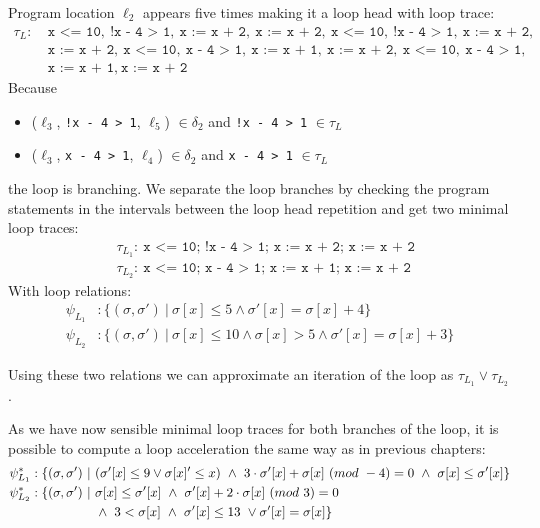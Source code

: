 \documentclass{article}
\begin{document}
Program location $\ell_2$ appears five times making it a loop head with loop trace:
\begin{align*}
    \tau_L:\ &\texttt{x <= 10},\ \texttt{!x - 4 > 1},\ \texttt{x := x + 2},\ \texttt{x := x + 2},\ \texttt{x <= 10},\ \texttt{!x - 4 > 1},\ \texttt{x := x + 2},\ \\ &\texttt{x := x + 2},\ \texttt{x <= 10},\ \texttt{x - 4 > 1},\ \texttt{x := x + 1},\ \texttt{x := x + 2},\ \texttt{x <= 10},\ \texttt{x - 4 > 1},\ \\ &\texttt{x := x + 1},\ \texttt{x := x + 2}
\end{align*}
Because \begin{itemize}
    \item ($\ell_3$, \texttt{!x - 4 > 1}, $\ell_5$) $\in \delta_2$ and \texttt{!x - 4 > 1} $\in \tau_L$
    \item ($\ell_3$, \texttt{x - 4 > 1}, $\ell_4$) $\in \delta_2$ and \texttt{x - 4 > 1} $\in \tau_L$
\end{itemize}
the loop is branching.
We separate the loop branches by checking the program statements in the intervals between the loop head repetition and get two minimal loop traces:
\begin{align*}
    &\tau_{L_1}:\ \texttt{x <= 10; !x - 4 > 1; x := x + 2;\ x := x + 2} \\
    &\tau_{L_2}:\ \texttt{x <= 10; x - 4 > 1; x := x + 1; x := x + 2}
\end{align*}
With loop relations:
\begin{align*}
    \psi_{L_{1}} &: \{(\sigma, \sigma')\ |\ \sigma[x] \leq 5 \land  \sigma'[x] = \sigma[x] + 4 \} \\
    \psi_{L_{2}}&: \{(\sigma, \sigma')\ |\ \sigma[x] \leq 10 \land \sigma[x] > 5 \land  \sigma'[x] = \sigma[x] + 3 \}
\end{align*}

Using these two relations we can approximate an iteration of the loop as $\tau_{L_1} \lor \tau_{L_2}$. \\ \par
As we have now sensible minimal loop traces for both branches of the loop, it is possible to compute a loop acceleration the same way as in previous chapters:
\begin{align*}
    \psi_{L_{1}}^* &: \{(\sigma, \sigma')\ |\ (\sigma'[x] \leq 9 \lor \sigma[x]' \leq x)\ \land\ 3\cdot \sigma'[x] + \sigma[x]\ (mod\ -4) = 0\ \land\ \sigma[x] \leq \sigma'[x] \} \\
    \psi_{L_{2}}^* &: \{ (\sigma, \sigma')\ | \ \sigma[x] \leq \sigma'[x]\ \land\ \sigma'[x] + 2 \cdot \sigma[x]\ (mod\ 3) = 0 \\
    &\hspace*{1.75cm} \land\ 3 < \sigma[x]\ \land\ \sigma'[x] \leq 13 \ \lor \sigma'[x] = \sigma[x]\}
\end{align*}
\end{document}
